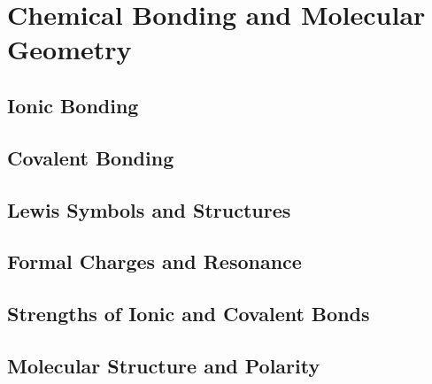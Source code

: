 \documentclass[12pt, openany, letterpaper]{memoir}
\begin{document}
\chapter{Chemical Bonding and Molecular Geometry}

\section{Ionic Bonding}

\section{Covalent Bonding}

\section{Lewis Symbols and Structures}

\section{Formal Charges and Resonance}

\section{Strengths of Ionic and Covalent Bonds}

\section{Molecular Structure and Polarity}
\end{document}
